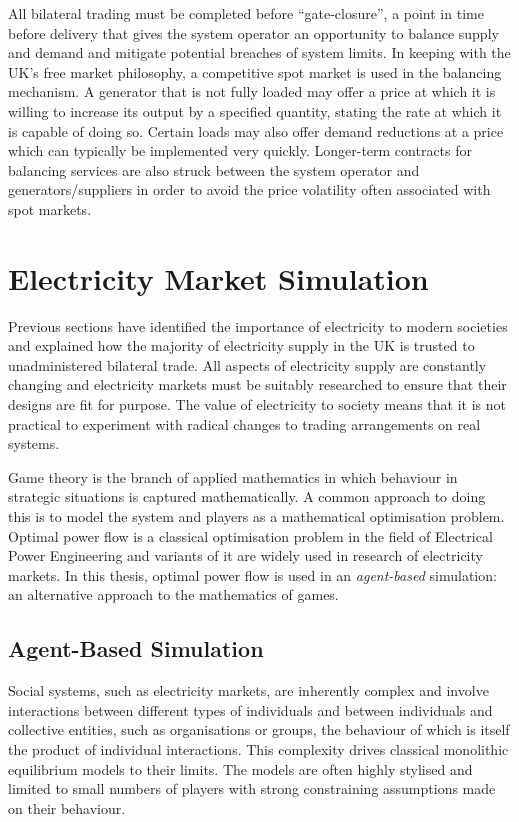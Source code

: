 All bilateral trading must be completed before ``gate-closure'', a
point in time before delivery that gives the system operator an
opportunity to balance supply and demand and mitigate potential breaches of
system limits.  In keeping with the UK's free market philosophy, a competitive
spot market \cite{schweppe:spot} is used in the balancing mechanism.  A
generator that is not fully loaded may offer a price at which it is willing to
increase its output by a specified quantity, stating the rate at which it is
capable of doing so.  Certain loads may also offer demand reductions at a
price which can typically be implemented very quickly.  Longer-term contracts
for balancing services are also struck between the system operator and
generators/suppliers in order to avoid the price volatility often associated
with spot markets.

\section{Electricity Market Simulation}
Previous sections have identified the importance of electricity to
modern societies and explained how the majority of electricity supply in the UK
is trusted to unadministered bilateral trade.  All aspects of electricity
supply are constantly changing and electricity markets must be
suitably researched to ensure that their designs are fit for purpose.  The
value of electricity to society means that it is not practical to experiment
with radical changes to trading arrangements on real systems.

Game theory is the branch of applied mathematics in which behaviour in
strategic situations is captured mathematically.  A common approach to doing
this is to model the system and players as a mathematical optimisation
problem.  Optimal power flow is a classical optimisation problem in the field
of Electrical Power Engineering and variants of it are widely used in
research of electricity markets.  In this thesis, optimal power flow is used in
an \textit{agent-based} simulation: an alternative approach to the mathematics
of games.

\subsection{Agent-Based Simulation}
Social systems, such as electricity markets, are inherently complex and involve
interactions between different types of individuals and between individuals
and collective entities, such as organisations or groups, the behaviour of which
is itself the product of individual interactions.  This complexity
drives classical monolithic equilibrium models to their limits.  The models are
often highly stylised and limited to small numbers of players with strong
constraining assumptions made on their behaviour.

